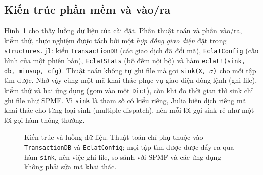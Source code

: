 \subsection{Kiến trúc phần mềm và vào/ra}
\label{sec:kien-truc}

Hình~\ref{fig:f02} cho thấy luồng dữ liệu của cài đặt. Phần thuật toán và phần vào/ra, kiểm thử, thực nghiệm được tách bởi một \emph{hợp đồng giao diện} đặt trong \texttt{structures.jl}: kiểu \texttt{TransactionDB} (các giao dịch đã đổi mã), \texttt{EclatConfig} (cấu hình của một phiên bản), \texttt{EclatStats} (bộ đếm nội bộ) và hàm \texttt{eclat!(sink, db, minsup, cfg)}. Thuật toán không tự ghi file mà gọi \texttt{sink(X, $\sigma$)} cho mỗi tập tìm được. Nhờ vậy cùng một mã khai thác phục vụ giao diện dòng lệnh (ghi file), kiểm thử và hai ứng dụng (gom vào một \texttt{Dict}), còn khi đo thời gian thì sink chỉ ghi file như SPMF. Vì \texttt{sink} là tham số có kiểu riêng, Julia biên dịch riêng mã khai thác cho từng loại sink (multiple dispatch), nên mỗi lời gọi sink rẻ như một lời gọi hàm thông thường.

\begin{figure}[t]
\centering
{}
\caption{Kiến trúc và luồng dữ liệu. Thuật toán chỉ phụ thuộc vào \texttt{TransactionDB} và \texttt{EclatConfig}; mọi tập tìm được được đẩy ra qua hàm \texttt{sink}, nên việc ghi file, so sánh với SPMF và các ứng dụng không phải sửa mã khai thác.}
\label{fig:f02}
\end{figure}

